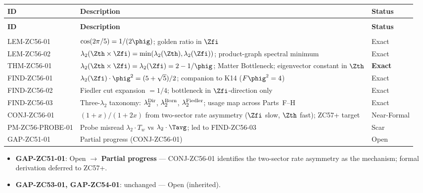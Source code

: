 \documentclass[12pt, a4paper]{article}
\begin{document}
\bigskip
{}
\begin{formalbox}[title={Atomic Registry --- ZC56}]
{\small
\setlength{\LTpre}{4pt}
\setlength{\LTpost}{4pt}
\renewcommand{\arraystretch}{1.30}
\begin{longtable}{>{\raggedright\arraybackslash}p{3.2cm}
                  >{\raggedright\arraybackslash}p{7.0cm}
                  >{\centering\arraybackslash}p{2.0cm}}
\toprule
\textbf{ID} & \textbf{Description} & \textbf{Status} \\
\midrule
\endfirsthead
\multicolumn{3}{l}{\small\textit{(continued)}}\\[4pt]
\toprule
\textbf{ID} & \textbf{Description} & \textbf{Status} \\
\midrule
\endhead
\midrule
\multicolumn{3}{r}{\small\textit{(continues)}}\\
\endfoot
\bottomrule
\endlastfoot
LEM-ZC56-01 &
  $\cos(2\pi/5)=1/(2\phig)$; golden ratio in $\Zfi$ &
  Exact \\[4pt]
LEM-ZC56-02 &
  $\lambda_2(\Zth\times\Zfi)=\min(\lambda_2(\Zth),\lambda_2(\Zfi))$;
  product-graph spectral minimum &
  Exact \\[4pt]
THM-ZC56-01 &
  $\lambda_2(\Zth\times\Zfi)=\lambda_2(\Zfi)=2-1/\phig$;
  Matter Bottleneck; eigenvector constant in $\Zth$ &
  \textbf{Exact} \\[4pt]
FIND-ZC56-01 &
  $\lambda_2(\Zfi)\cdot\phig^2=(5+\sqrt{5})/2$;
  companion to K14 ($F\phig^2=4$) &
  Exact \\[4pt]
FIND-ZC56-02 &
  Fiedler cut expansion $= 1/4$; bottleneck in
  $\Zfi$-direction only &
  Exact \\[4pt]
FIND-ZC56-03 &
  Three-$\lambda_2$ taxonomy: $\lambda_2^{\rm Dir}$,
  $\lambda_2^{\rm Born}$, $\lambda_2^{\rm Fiedler}$;
  usage map across Parts~F--H &
  Exact \\[4pt]
CONJ-ZC56-01 &
  $(1+x)/(1+2x)$ from two-sector rate asymmetry
  ($\Zfi$ slow, $\Zth$ fast); ZC57+ target &
  Near-Formal \\[4pt]
PM-ZC56-PROBE-01 &
  Probe misread $\lambda_2\cdot T_w$ vs $\lambda_2\cdot\Tavg$;
  led to FIND-ZC56-03 &
  Scar \\[4pt]
\midrule
GAP-ZC51-01 & Partial progress (CONJ-ZC56-01) & Open \\
\end{longtable}
}
\end{formalbox}

\begin{keybox}[title={Gap Status Updates}]
\begin{itemize}[leftmargin=1.5em, noitemsep]
\item \textbf{GAP-ZC51-01}: Open $\to$ \textbf{Partial progress}
  --- CONJ-ZC56-01 identifies the two-sector rate asymmetry as
  the mechanism; formal derivation deferred to ZC57+.
\item \textbf{GAP-ZC53-01, GAP-ZC54-01}: unchanged --- Open
  (inherited).
\end{itemize}
\end{keybox}
\end{document}
